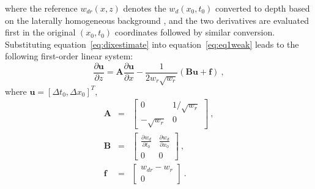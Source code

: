 where the reference $w_{dr}(x,z)$ denotes the $w_d (x_0,t_0)$ converted to depth based on the laterally homogeneous background , and the two derivatives are evaluated first in the original $(x_0,t_0)$ coordinates followed by similar conversion. Substituting equation~\ref{eq:dixestimate} into equation~\ref{eq:eq1weak} leads to the following first-order linear system:
\begin{equation}
\label{eq:t2dweak}
\frac{\partial \mathbf{u} }{\partial z} = \mathbf{A} \frac{\partial \mathbf{u} }{\partial x} -\frac{1}{2 w_r\sqrt{w_r}}\left(\mathbf{B} \mathbf{u} + \mathbf{f}\right)~,
\end{equation}
where $\mathbf{u} = [\Delta t_0, \Delta x_0]^T$,
\begin{eqnarray}
\mathbf{A} & = & 	\begin{bmatrix}
					0 & 1/\sqrt{w_r} \\
					-\sqrt{w_r} & 0
					\end{bmatrix}~, \\
\mathbf{B} & = &  	\begin{bmatrix}
					\frac{\partial w_d}{\partial t_0}& \frac{\partial w_d}{\partial x_0} \\
					0 & 0
					\end{bmatrix}~, \\
\mathbf{f} & = & 	\begin{bmatrix}
					w_{dr}-w_r \\
					0
					\end{bmatrix}~.
\end{eqnarray}
